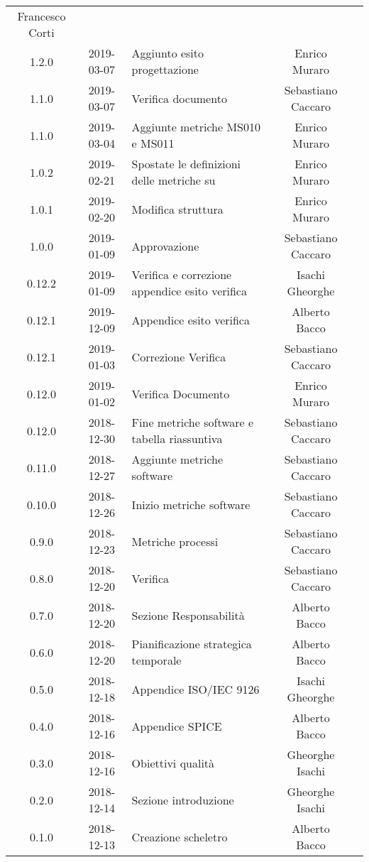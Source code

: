{\begin{longtable}{c c C{4cm} c  c }
		Francesco Corti &
		\ver{} \\
		1.2.0 &
		2019-03-07 &
		Aggiunto esito progettazione &
		Enrico Muraro &
		\reda{}
		\\
		1.1.0 &
		2019-03-07 &
		Verifica documento &
		Sebastiano Caccaro &
		\ver{}
		\\
		1.1.0 &
		2019-03-04 &
		Aggiunte metriche MS010 e MS011 &
		Enrico Muraro &
		\reda{}
		\\
		1.0.2 &
		2019-02-21 &
		Spostate le definizioni delle metriche su \NdP &
		Enrico Muraro &
		\reda{}
		\\
		1.0.1 &
		2019-02-20 &
		Modifica struttura &
		Enrico Muraro &
		\reda{}
		\\
		1.0.0 &
		2019-01-09 &
		Approvazione &
		Sebastiano Caccaro &
		\Res{}
		\\
		0.12.2 &
		2019-01-09 &
		Verifica e correzione appendice esito verifica &
		Isachi Gheorghe &
		\ver{}
		\\
		0.12.1 &
		2019-12-09 &
		Appendice esito verifica &
		Alberto Bacco &
		\ver{}
		\\
		0.12.1 &
		2019-01-03 &
		Correzione Verifica &
		Sebastiano Caccaro &
		\reda{}
		\\
		0.12.0 &
		2019-01-02 &
		Verifica Documento &
		Enrico Muraro &
		\ver{}
		\\
		0.12.0 &
		2018-12-30 &
		Fine metriche software e tabella riassuntiva &
		Sebastiano Caccaro &
		\reda{}
		\\
		0.11.0 &
		2018-12-27 &
		Aggiunte metriche software  &
		Sebastiano Caccaro &
		\reda{}
		\\
		0.10.0 &
		2018-12-26 &
		Inizio metriche software &
		Sebastiano Caccaro &
		\reda{}
		\\
		0.9.0 &
		2018-12-23 &
		Metriche processi &
		Sebastiano Caccaro &
		\reda{}
		\\
		0.8.0 &
		2018-12-20 &
		Verifica &
		Sebastiano Caccaro &
		\reda{}		
		\\
		0.7.0 &
		2018-12-20 &
		Sezione Responsabilità &
		Alberto Bacco &
		\reda{}
		\\
		0.6.0 &
		2018-12-20 &
		Pianificazione strategica temporale &
		Alberto Bacco &
		\reda{}
		\\
		0.5.0 &
		2018-12-18 &
		Appendice ISO/IEC 9126 &
		Isachi Gheorghe &
		\reda{}
		\\
		0.4.0 &
		2018-12-16 &
		Appendice SPICE &
		Alberto Bacco &
		\reda{}
		\\
		0.3.0 &
		2018-12-16 &
		Obiettivi qualità &
		Gheorghe Isachi &
		\reda{}
		\\
		0.2.0 &
		2018-12-14 &
		Sezione introduzione &
		Gheorghe Isachi&
		\reda{}
		\\
		0.1.0 &
		2018-12-13 &
		Creazione scheletro &
		Alberto Bacco&
		\reda{}
		\\
	\end{longtable}

}